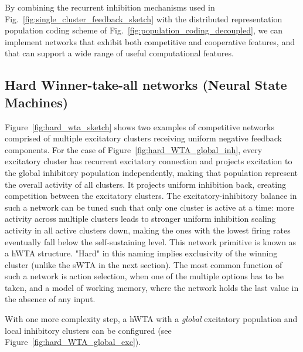 
By combining the recurrent inhibition mechanisms used in Fig.~\ref{fig:single_cluster_feedback_sketch} with the distributed representation population coding scheme of Fig.~\ref{fig:population_coding_decoupled}, we can implement networks that exhibit both competitive and cooperative features, and that can support a wide range of useful computational features.



\subsection{Hard Winner-take-all networks (Neural State Machines)}



Figure~\ref{fig:hard_wta_sketch} shows two examples of competitive networks comprised of multiple excitatory clusters receiving uniform negative feedback components. For the case of Figure~\ref{fig:hard_WTA_global_inh}, every excitatory cluster has recurrent excitatory connection and projects excitation to the global inhibitory population independently, making that population represent the overall activity of all clusters. It projects uniform inhibition back, creating competition between the excitatory clusters. The excitatory-inhibitory balance in such a network can be tuned such that only one cluster is active at a time: more activity across multiple clusters leads to stronger uniform inhibition scaling activity in all active clusters down, making the ones with the lowest firing rates eventually fall below the self-sustaining level.
This network primitive is known as a \ac{hWTA} structure. "Hard" in this naming implies exclusivity of the winning cluster (unlike the \ac{sWTA} in the next section). The most common function of such a network is action selection, when one of the multiple options has to be taken, and a model of working memory, where the network holds the last value in the absence of any input.

With one more complexity step, a \ac{hWTA} with a \emph{global} excitatory population and local inhibitory clusters can be configured (see Figure~\ref{fig:hard_WTA_global_exc}).


